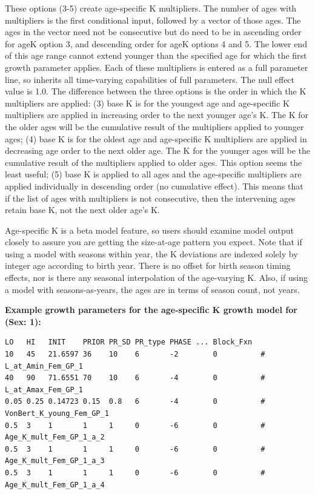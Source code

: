\hypertarget{AgeSpecificK}{}
These options (3-5) create age-specific K multipliers. The number of ages with multipliers is the first conditional input, followed by a vector of those ages. The ages in the vector need not be consecutive but do need to be in ascending order for ageK option 3, and descending order for ageK options 4 and 5. The lower end of this age range cannot extend younger than the specified age for which the first growth parameter applies. Each of these multipliers is entered as a full parameter line, so inherits all time-varying capabilities of full parameters. The null effect value is 1.0. The difference between the three options is the order in which the K multipliers are applied:
(3)  base K is for the youngest age and age-specific K multipliers are applied in increasing order to the next younger age’s K. The K for the older ages will be the cumulative result of the multipliers applied to younger ages;
(4)  base K is for the oldest age and age-specific K multipliers are applied in decreasing age order to the next older age. The K for the younger ages will be the cumulative result of the multipliers applied to older ages. This option seems the least useful;
(5)  base K is applied to all ages and the age-specific multipliers are applied individually in descending order (no cumulative effect). This means that if the list of ages with multipliers is not consecutive, then the intervening ages retain base K, not the next older age’s K.

Age-specific K is a beta model feature, so users should examine model output closely to assure you are getting the size-at-age pattern you expect. Note that if using a model with seasons within year, the K deviations are indexed solely by integer age according to birth year. There is no offset for birth season timing effects, nor is there any seasonal interpolation of the age-varying K.  Also, if using a model with seasons-as-years, the ages are in terms of season count, not years.

\textbf{Example growth parameters for the age-specific K growth model for (Sex: 1):}

\begin{verbatim}
LO   HI   INIT    PRIOR PR_SD PR_type PHASE ... Block_Fxn 
10   45   21.6597 36    10    6       -2        0          # L_at_Amin_Fem_GP_1
40   90   71.6551 70    10    6       -4        0          # L_at_Amax_Fem_GP_1
0.05 0.25 0.14723 0.15  0.8   6       -4        0          # VonBert_K_young_Fem_GP_1
0.5  3    1       1     1     0       -6        0          # Age_K_mult_Fem_GP_1_a_2
0.5  3    1       1     1     0       -6        0          # Age_K_mult_Fem_GP_1_a_3
0.5  3    1       1     1     0       -6        0          # Age_K_mult_Fem_GP_1_a_4
\end{verbatim}

